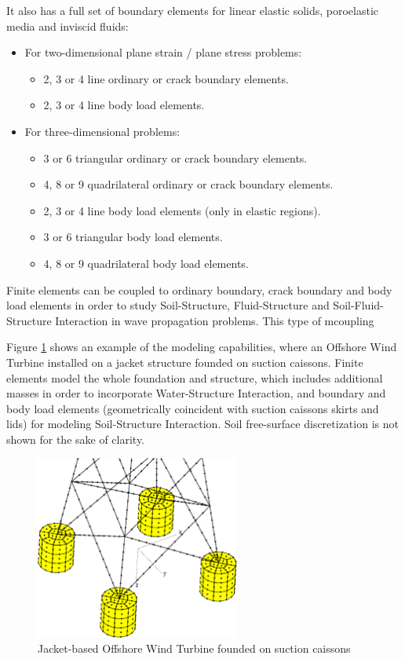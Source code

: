 \documentclass[a4paper,fleqn]{book}
\begin{document}
It also has a full set of boundary elements for linear elastic solids, poroelastic media and inviscid fluids:
\begin{itemize}
    \item For two-dimensional plane strain / plane stress problems:
    \begin{itemize}
        \item 2, 3 or 4 line ordinary or crack boundary elements.
        \item 2, 3 or 4 line body load elements.
    \end{itemize}
    \item For three-dimensional problems:
    \begin{itemize}
        \item 3 or 6 triangular ordinary or crack boundary elements.
        \item 4, 8 or 9 quadrilateral ordinary or crack boundary elements.
        \item 2, 3 or 4 line body load elements (only in elastic regions).
        \item 3 or 6 triangular body load elements.
        \item 4, 8 or 9 quadrilateral body load elements.        
    \end{itemize}
\end{itemize}

Finite elements can be coupled to ordinary boundary, crack boundary and body load elements in order to study Soil-Structure, Fluid-Structure and Soil-Fluid-Structure Interaction in wave propagation problems. This type of mcoupling

Figure \ref{fig:owt} shows an example of the modeling capabilities, where an Offshore Wind Turbine installed on a jacket structure founded on suction caissons. Finite elements model the whole foundation and structure, which includes additional masses in order to incorporate Water-Structure Interaction, and boundary and body load elements (geometrically coincident with suction caissons skirts and lids) for modeling Soil-Structure Interaction. Soil free-surface discretization is not shown for the sake of clarity.

\begin{figure}[h]
\centering
\includegraphics[width=0.6\textwidth]{figures/shell_fe.eps}
\caption{Jacket-based Offshore Wind Turbine founded on suction caissons}
\label{fig:owt}
\end{figure}
\end{document}
